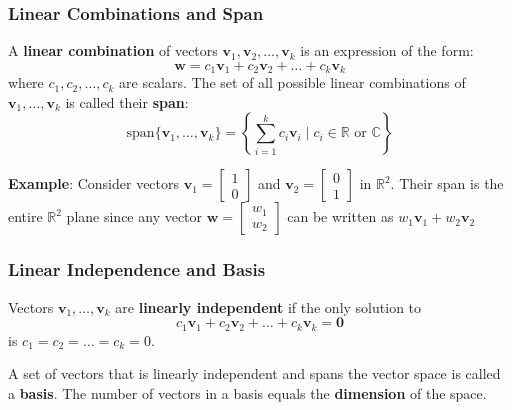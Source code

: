 \subsubsection{Linear Combinations and Span}

A \textbf{linear combination} of vectors $ \mathbf{v}_1, \mathbf{v}_2, \ldots, \mathbf{v}_k $ is an expression of the form:
\begin{equation*}
    \mathbf{w} = c_1 \mathbf{v}_1 + c_2 \mathbf{v}_2 + \ldots + c_k \mathbf{v}_k
\end{equation*}
where $ c_1, c_2, \ldots, c_k $ are scalars. The set of all possible linear combinations of $ \mathbf{v}_1, \ldots, \mathbf{v}_k $ is called their \textbf{span}:
\begin{equation*}
    \text{span}\{\mathbf{v}_1, \ldots, \mathbf{v}_k\} = \left\{ \sum_{i=1}^k c_i \mathbf{v}_i \mid c_i \in \mathbb{R} \text{ or } \mathbb{C} \right\}
\end{equation*}

\begin{exampleBox}
    \textbf{Example}: Consider vectors $ \mathbf{v}_1 = \begin{bmatrix}1 \\ 0\end{bmatrix} $ and $ \mathbf{v}_2 = \begin{bmatrix}0 \\ 1\end{bmatrix} $ in $ \mathbb{R}^2 $. Their span is the entire $ \mathbb{R}^2 $ plane since any vector $ \mathbf{w} = \begin{bmatrix}w_1 \\ w_2\end{bmatrix} $ can be written as $ w_1 \mathbf{v}_1 + w_2 \mathbf{v}_2 $
\end{exampleBox}

\subsubsection{Linear Independence and Basis}
Vectors $ \mathbf{v}_1, \ldots, \mathbf{v}_k $ are \textbf{linearly independent} if the only solution to
\begin{equation*}
    c_1 \mathbf{v}_1 + c_2 \mathbf{v}_2 + \ldots + c_k \mathbf{v}_k = \mathbf{0}
\end{equation*}
is $ c_1 = c_2 = \ldots = c_k = 0 $.

A set of vectors that is linearly independent and spans the vector space is called a \textbf{basis}. The number of vectors in a basis equals the \textbf{dimension} of the space.


